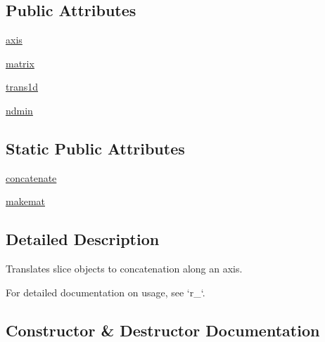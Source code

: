 \subsection*{Public Attributes}
\begin{DoxyCompactItemize}
\item 
\hyperlink{classnumpy_1_1lib_1_1index__tricks_1_1AxisConcatenator_a34cd4e70817918f8f243f77985e25828}{axis}
\item 
\hyperlink{classnumpy_1_1lib_1_1index__tricks_1_1AxisConcatenator_ae384626def4eb41d3f41858093111dfd}{matrix}
\item 
\hyperlink{classnumpy_1_1lib_1_1index__tricks_1_1AxisConcatenator_a7d08829f90900781ebd21ef6fbc35360}{trans1d}
\item 
\hyperlink{classnumpy_1_1lib_1_1index__tricks_1_1AxisConcatenator_a3a5aef13d3fa134f942ee1c843197f7e}{ndmin}
\end{DoxyCompactItemize}
\subsection*{Static Public Attributes}
\begin{DoxyCompactItemize}
\item 
\hyperlink{classnumpy_1_1lib_1_1index__tricks_1_1AxisConcatenator_a812077059f7011fc5ca55540f5148ca8}{concatenate}
\item 
\hyperlink{classnumpy_1_1lib_1_1index__tricks_1_1AxisConcatenator_aae107618456a46eb9de9ed27bb87cabb}{makemat}
\end{DoxyCompactItemize}


\subsection{Detailed Description}
\begin{DoxyVerb}Translates slice objects to concatenation along an axis.

For detailed documentation on usage, see `r_`.
\end{DoxyVerb}
 

\subsection{Constructor \& Destructor Documentation}
\mbox{\label{classnumpy_1_1lib_1_1index__tricks_1_1AxisConcatenator_acd1d2fd61f5edbf19205bb60e57d5ee2}} 
